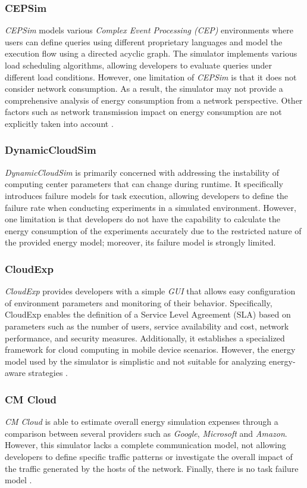 {\subsubsection*{CEPSim}
\emph{CEPSim} \cite{higashino2015cepsim} models various \emph{Complex Event Processing (CEP)} environments \cite{luckham1998complex} where users can define queries using different proprietary languages and model the execution flow using a directed acyclic graph. The simulator implements various load scheduling algorithms, allowing developers to evaluate queries under different load conditions. However, one limitation of \emph{CEPSim} is that it does not consider network consumption. As a result, the simulator may not provide a comprehensive analysis of energy consumption from a network perspective. Other factors such as network transmission impact on energy consumption are not explicitly taken into account \cite{mansouri2020cloud}.
\subsubsection*{DynamicCloudSim}
\emph{DynamicCloudSim} \cite{bux2013dynamiccloudsim} is primarily concerned with addressing the instability of computing center parameters that can change during runtime. It specifically introduces failure models for task execution, allowing developers to define the failure rate when conducting experiments in a simulated environment. However, one limitation is that developers do not have the capability to calculate the energy consumption of the experiments accurately due to the restricted nature of the provided energy model; moreover, its failure model is strongly limited. \cite{mansouri2020cloud} \cite{suryateja2016comparative}
\subsubsection*{CloudExp}
\emph{CloudExp} \cite{jararweh2014cloudexp} provides developers with a simple \emph{GUI} that allows easy configuration of environment parameters and monitoring of their behavior. Specifically, CloudExp enables the definition of a Service Level Agreement (SLA) based on parameters such as the number of users, service availability and cost, network performance, and security measures. Additionally, it establishes a specialized framework for cloud computing in mobile device scenarios. However, the energy model used by the simulator is simplistic and not suitable for analyzing energy-aware strategies \cite{mansouri2020cloud} \cite{khalil2017cloud}.
\subsubsection*{CM Cloud}
\emph{CM Cloud} \cite{alves2016cm} is able to estimate overall energy simulation expenses through a comparison between several providers such as \emph{Google}, \emph{Microsoft} and \emph{Amazon}. However, this simulator lacks a complete communication model, not allowing developers to define specific traffic patterns or investigate the overall impact of the traffic generated by the hosts of the network. Finally, there is no task failure model \cite{mansouri2020cloud}.
}
